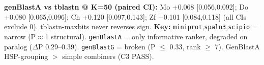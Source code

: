 \begin{table}[!t]
\vspace{2pt}
\footnotesize
\textbf{genBlastA vs tblastn @ K=50 (paired CI):} Mo +0.068 [0.056,0.092]; Do +0.080 [0.065,0.096]; Ch +0.120 [0.097,0.143]; Zf +0.101 [0.084,0.118] (all CIs exclude 0). tblastn-maxbits never reverses sign. \textbf{Key:} \texttt{miniprot},\texttt{spaln3},\texttt{scipio} = narrow (P$\approx$1 structural). \texttt{genBlastA} = only informative ranker, degraded on paralog ($\Delta$P 0.29--0.39). \texttt{genBlastG} = broken (P $\le$ 0.33, rank $\ge$ 7). GenBlastA HSP-grouping $>$ simple combiners (C3 PASS).
\end{table}
